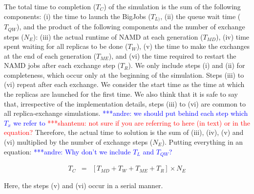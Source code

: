 \documentclass{rspublic}
\newcommand{\jhanote}[1]{ {\textcolor{red} { ***shantenu: #1 }}}
\newcommand{\alnote}[1]{ {\textcolor{blue} { ***andre: #1 }}}
\newcommand{\alnote}[1]{}
\newcommand{\jhanote}[1]{}
\begin{document}
The total time to completion ($T_{C}$) of the simulation is the sum of
the following components: (i) the time to launch the BigJobs
($T_{L)}$, (ii) the queue wait time ($T_{QW}$), and the product of the
following components and the number of exchange steps ($N_{E}$): (iii)
the actual runtime of NAMD at each generation ($T_{MD}$), (iv) time
spent waiting for all replicas to be done ($T_{W}$), (v) the time to
make the exchanges at the end of each generation ($T_{ME}$), and (vi)
the time required to restart the NAMD jobs after each exchange step
($T_{R}$). We only include steps (i) and (ii) for completeness, which
occur only at the beginning of the simulation. Steps (iii) to (vi)
repeat after each exchange. We consider the start time as the time at
which the replicas are launched for the first time. We also think that
it is safe to say that, irrespective of the implementation details,
steps (iii) to (vi) are common to all replica-exchange
simulations. \alnote{we should put behind each step which $T_{x}$ we
  refer to} \jhanote{not sure if you are referring to here (in text)
  or in the equation?} Therefore, the actual time to solution is the
sum of (iii), (iv), (v) and (vi) multiplied by the number of exchange
steps ($N_{E}$). Putting everything in an equation:
\alnote{Why don't we include $T_{L}$ and $T_{QW}$?}

\begin{eqnarray}
T_{C} &=& [T_{MD} + T_{W} + T_{ME} + T_{R}] \times N_{E}
\label{eq:equation 1}
\end{eqnarray}

Here, the steps (v) and (vi) occur in a serial manner.
 
\end{document}
